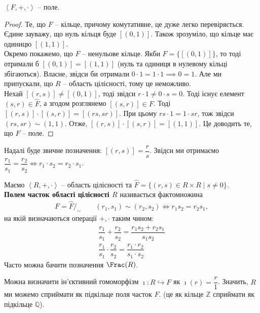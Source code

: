 \documentclass{math_library}
\begin{document}
\begin{theorem}
$\left< F, +, \cdot \right>$ -- поле.
\end{theorem}

\begin{proof}
Те, що $F$ -- кільце, причому комутативне, це дуже легко перевіряється. Єдине зауважу, що нуль кільця буде $[(0,1)]$. Також зрозуміло, що кільце має одиницю $[(1,1)]$.\\
Окремо покажемо, що $F$ -- ненульове кільце. Якби $F = \{ [(0,1)]\}$, то тоді отримали б $[(0,1)] = [(1,1)]$ (нуль та одиниця в нулевому кільці збігаються). Власне, звідси би отримали $0 \cdot 1 = 1 \cdot 1 \implies 0 = 1$. Але ми припускали, що $R$ -- область цілісності, тому це неможливо.\\
Нехай $[(r,s)] \neq [(0,1)]$, тоді звідси $r \cdot 1 \neq 0 \cdot s = 0$. Тоді існує елемент $(s,r) \in \hat{F}$, а згодом розглянемо $[(s,r)] \in F$. Тоді $[(r,s)] \cdot [(s,r)] = [(rs,sr)]$. При цьому $rs \cdot 1 = 1 \cdot sr$, тож звідси $(rs,sr) \sim (1,1)$. Отже, $[(r,s)] \cdot [(s,r)] = [(1,1)]$. Це доводить те, що $F$ -- поле.
\end{proof}

Надалі буде звичне позначення: $[(r,s)] = \dfrac{r}{s}$. Звідси ми отримаємо $\dfrac{r_1}{s_1} = \dfrac{r_2}{s_2} \iff r_1 \cdot s_2 = r_2 \cdot s_1$.

\begin{definition}
Маємо $\left<R,+,\cdot\right>$ -- область цілісності та $\hat{F} = \{ (r,s) \in R \times R \mid s \neq 0 \}$.\\
\textbf{Полем часток області цілісності $R$} називається фактомножина
\begin{align*}
F = \hat{F}/_\sim \qquad (r_1,s_1) \sim (r_2,s_2) \iff r_1 s_2 = r_2 s_1,
\end{align*}
на якій визначаються операції $+,\cdot$ таким чином:
\begin{align*}
\dfrac{r_1}{s_1} + \dfrac{r_2}{s_2} = \dfrac{r_1 s_2 + r_2 s_1}{s_1 s_2} \\
\dfrac{r_1}{s_1} \cdot \dfrac{r_2}{s_2} = \dfrac{r_1 \cdot r_2}{s_1 \cdot s_2}
\end{align*}
Часто можна бачити позначення $\Frac(R)$.
\end{definition}

\begin{remark}
Можна визначити ін'єктивний гомоморфізм $\imath \colon R \hookrightarrow F$ як $\imath(r) = \dfrac{r}{1}$. Значить, $R$ ми можемо сприймати як підкільце поля часток $F$. (це як кільце $\mathbb{Z}$ сприймати як підкільце $\mathbb{Q}$).
\end{remark}
\end{document}
